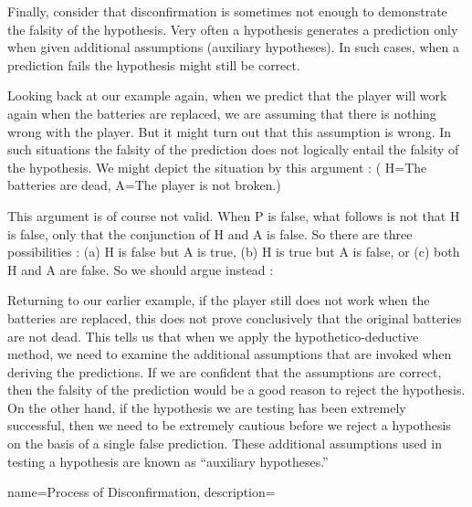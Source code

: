 Finally, consider that disconfirmation is sometimes not enough to demonstrate the falsity of the hypothesis. Very often a hypothesis generates a prediction only when given additional assumptions (auxiliary hypotheses). In such cases, when a prediction fails the hypothesis might still be correct.

Looking back at our example again, when we predict that the player will work again when the batteries are replaced, we are assuming that there is nothing wrong with the player. But it might turn out that this assumption is wrong. In such situations the falsity of the prediction does not logically entail the falsity of the hypothesis. We might depict the situation by this argument : ( H=The batteries are dead, A=The player is not broken.)

\begin{kormanize}
\end{kormanize}

This argument is of course not valid. When P is false, what follows is not that H is false, only that the conjunction of H and A is false. So there are three possibilities : (a) H is false but A is true, (b) H is true but A is false, or (c) both H and A are false. So we should argue instead :

\begin{kormanize}
\end{kormanize}

Returning to our earlier example, if the player still does not work when the batteries are replaced, this does not prove conclusively that the original batteries are not dead. This tells us that when we apply the hypothetico-deductive method, we need to examine the additional assumptions that are invoked when deriving the predictions. If we are confident that the assumptions are correct, then the falsity of the prediction would be a good reason to reject the hypothesis. On the other hand, if the hypothesis we are testing has been extremely successful, then we need to be extremely cautious before we reject a hypothesis on the basis of a single false prediction. These additional assumptions used in testing a hypothesis are known as ``auxiliary hypotheses.''

{
name=Process of Disconfirmation,
description={}
}

